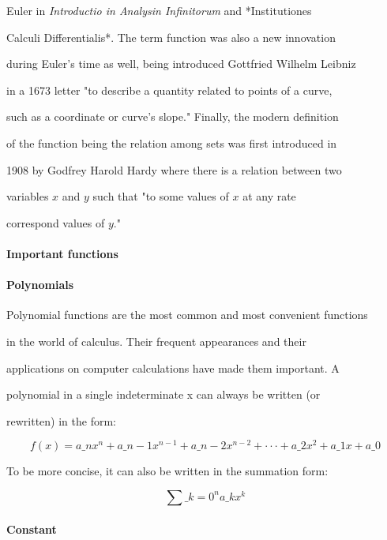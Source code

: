 Euler in \textit{Introductio in Analysin Infinitorum} and *Institutiones

Calculi Differentialis*. The term function was also a new innovation

during Euler's time as well, being introduced Gottfried Wilhelm Leibniz

in a 1673 letter "to describe a quantity related to points of a curve,

such as a coordinate or curve's slope." Finally, the modern definition

of the function being the relation among sets was first introduced in

1908 by Godfrey Harold Hardy where there is a relation between two

variables $x$ and $y$ such that "to some values of $x$ at any rate

correspond values of $y$."



\paragraph{Important functions}



\paragraph{Polynomials}



Polynomial functions are the most common and most convenient functions

in the world of calculus. Their frequent appearances and their

applications on computer calculations have made them important. A

polynomial in a single indeterminate x can always be written (or

rewritten) in the form:



$$f(x)=a\_n x^n+a\_{n-1}x^{n-1}+a\_{n-2}x^{n-2}+\cdot\cdot\cdot+a\_2x^2+a\_1x+a\_0$$



To be more concise, it can also be written in the summation form:



$$\sum\_{k=0}^n a\_k x^k$$



\paragraph{Constant}



